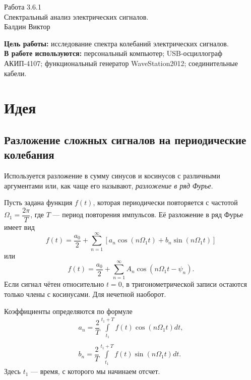 \documentclass[a4paper,12pt]{article}
\begin{document}
\begin{center}
  \LARGE{Работа 3.6.1}\\[0.2cm]
  \LARGE{Спектральный анализ электрических сигналов.}\\[0.2cm]
  \large{Балдин Виктор}\\[0.2cm]
\end{center}

\textbf{Цель работы:} исследование спектра колебаний электрических сигналов.\\
\textbf{В работе используются:} персональный  компьютер; USB-осциллограф  АКИП-4107; функциональный генератор WaveStation2012; соединительные кабели.\\
\section*{Идея}
\subsection*{Разложение сложных сигналов на периодические колебания}
Используется разложение в сумму синусов и косинусов с различными аргументами или, как чаще его называют, \textit{разложение в ряд Фурье}.

Пусть задана функция $f(t)$, которая периодически повторяется с частотой $\Omega_1 = \dfrac{2\pi}{T}$, где $T$ --- период повторения импульсов. Её разложение в ряд Фурье имеет вид
\begin{equation}
f(t) = \dfrac{a_0}{2} + \sum\limits_{n = 1}^{\infty}\left[a_n \cos \left(n \Omega_1t\right) + b_n \sin \left(n \Omega_1t\right)\right]
\end{equation}
или
\begin{equation}
f(t) = \dfrac{a_0}{2} + \sum\limits_{n = 1}^{\infty}A_n \cos \left(n\Omega_1t-\psi_n\right).
\end{equation}
Если сигнал чётен относительно $t=0$, в тригонометрической записи остаются только члены с косинусами. Для нечетной наоборот.

Коэффициенты определяются по формуле
\begin{equation}
\begin{array}{c}
a_n  = \dfrac{2}{T}\int\limits_{t_1}^{t_1+T}f(t)\cos\left(n \Omega_1 t\right) dt,\\
\\
b_n = \dfrac{2}{T}\int\limits_{t_1}^{t_1+T}f(t)\sin\left(n \Omega_1 t\right) dt.
\end{array}
\end{equation}
Здесь $t_1$ --- время, с которого мы начинаем отсчет.
\end{document}
